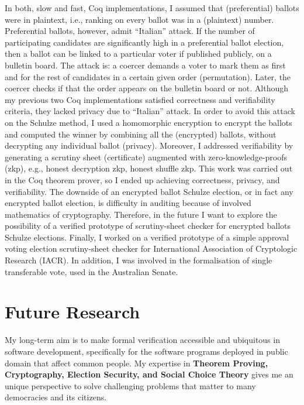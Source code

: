 \documentclass[11pt,a4paper,roman]{moderncv}
\begin{document}
In both, slow and fast, Coq implementations, I assumed that (preferential) ballots were in plaintext, i.e., 
ranking on every ballot was in a (plaintext) number.  Preferential ballots, 
however, admit ``Italian'' attack. 
If the number of participating candidates are significantly high in 
a preferential ballot election,
then a ballot can be linked to a particular voter if published publicly, on a bulletin board.
The attack is: a coercer demands a voter to mark them as first and for the rest of candidates
in a certain given order (permutation). Later, the coercer checks if that the order appears 
on the bulletin board or not. Although my previous two Coq implementations  
satisfied correctness and verifiability criteria, they lacked privacy due to ``Italian'' attack. 
In order to avoid this attack on the Schulze method, I used a homomorphic encryption 
to encrypt the ballots and computed the winner by combining all the 
(encrypted) ballots, without decrypting any individual ballot (privacy). 
Moreover, I addressed verifiability by generating a scrutiny sheet (certificate) 
augmented with zero-knowledge-proofs (zkp), e.g., honest decryption zkp, honest shuffle zkp. 
This work was carried out in the Coq theorem prover, so I ended up achieving
correctness, privacy, and verifiability. The downside of an encrypted ballot Schulze election, 
or in fact any encrypted ballot election, is difficulty in auditing because of involved 
mathematics of cryptography. Therefore, in the future I want to explore the possibility of a 
verified prototype of scrutiny-sheet checker for encrypted ballots Schulze elections.
Finally, I worked on a verified prototype of a simple approval voting election scrutiny-sheet checker for
International Association of Cryptologic Research (IACR). 
In addition, I was involved in the formalisation of single transferable vote, used in the Australian Senate.

\section{Future Research}
My long-term aim is to make formal verification accessible and ubiquitous in 
software development, specifically for the software programs deployed in public domain
that affect common people.
My expertise in \textbf{Theorem Proving, Cryptography, Election Security, and Social Choice Theory}
gives me an unique perspective to solve challenging problems that matter to many democracies 
and its citizens. 	
\end{document}
